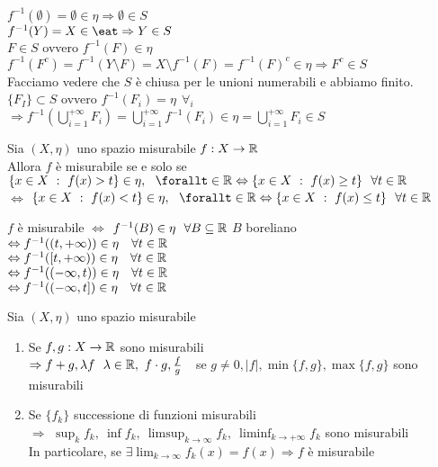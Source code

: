 \documentclass[12px]{article}
\begin{document}
	   \begin{dimo}
		   $f^{-1}(\emptyset) = \emptyset\in\eta \Rightarrow \emptyset \in S$ \\
		   $f^{-1}(Y) = X\in\eat \Rightarrow Y\in S$ \\
		   $F\in S$ ovvero $f^{-1}(F)\in\eta$\\
		   $f^{-1}(F^c) = f^{-1}(Y\setminus F) = X\setminus f^{-1}(F) = f^{-1}(F)^c\in \eta \Rightarrow F^c\in S$ \\
		   Facciamo vedere che $S$ è chiusa per le unioni numerabili e abbiamo finito.\\
		   $\{F_I\}\subset S$ ovvero  $f^{-1}(F_i) = \eta \ \ \forall_i$ \\
		   $ \Rightarrow f^{-1}( \bigcup^{+\infty}_{i=1}F_i) = \bigcup^{+\infty}_{i = 1}f^{-1}(F_i)\in \eta = \bigcup^{+\infty}_{i=1}F_i\in S$
	   \end{dimo}
	   \begin{prop}
	   	Sia $(X,\eta)$ uno spazio misurabile $f:X \rightarrow \mathbb{R}$\\
		Allora $f$ è misurabile se e solo se\\
		$ \{ x\in X \ :\ f(x) > t\}\in \eta, \ \ \forallt\in \R\\  \Leftrightarrow\{ x\in X \ :\ f(x) \geq t\}\ \ \forall t\in \R$ \\$ \Leftrightarrow$ $\{ x\in X \ :\ f(x) < t\}\in \eta, \ \ \forallt\in \R \\\Leftrightarrow\{ x\in X \ :\ f(x) \leq t\}\ \ \forall t\in \R $
	\end{prop}
	\begin{dimo}
		$f$ è misurabile $ \Leftrightarrow$ $f^{-1}(B)\in \eta\ \ \forall B\subseteq \mathbb{R}$  $B$ boreliano\\
		$ \Leftrightarrow f^{-1}((t,+\infty))\in\eta\ \ \ \forall t\in\R$ \\
		$ \Leftrightarrow f^{-1}([t,+\infty))\in\eta\ \ \ \forall t\in\R$ \\
		$ \Leftrightarrow f^{-1}((-\infty, t))\in\eta\ \ \ \forall t\in\R$ \\
		$ \Leftrightarrow f^{-1}((-\infty, t])\in\eta\ \ \ \forall t\in\R$ \\
	\end{dimo}
	\begin{prop}
		Sia $(X,\eta)$ uno spazio misurabile\\
		 \begin{enumerate}
			 \item Se $f,g: X \rightarrow\mathbb{R}$ sono misurabili\\
				 $ \Rightarrow f + g, \lambda f \ \ \lambda\in \mathbb{R}, \ f\cdot g , \frac fg \ \ $ se $g\neq 0, |f|, \min\{f,g\}, \max\{f,g\}$ sono misurabili
			 \item Se $\{f_k\}$ successione di funzioni misurabili\\
			 $ \Rightarrow $ $\sup_k f_k, \ \inf f_k, \ \limsup_{k \rightarrow\infty} f_k, \ \liminf_{k \rightarrow+\infty} f_k$ sono misurabili\\
			 In particolare, se $\exists \lim_{k \rightarrow\infty} f_k(x) = f(x) \Rightarrow f$ è misurabile

		\end{enumerate}
	\end{prop}
\end{document}
